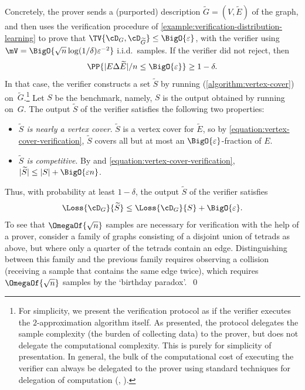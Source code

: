\begin{example}
	Concretely, the prover sends a (purported) description $\widetilde{G} = (V, \widetilde{E})$ of the graph, and then uses the verification procedure of \cref{example:verification-distribution-learning} to prove that $\TV{\cD_G,\cD_{\widetilde{G}}} \leq \BigO{\varepsilon}$, with the verifier using $\mV = \BigO{\sqrt{n}\log(1/\delta)\varepsilon^{-2}}$ i.i.d.\ samples.
	If the verifier did not reject, then 
	\begin{equation}
		\label{equation:vertex-cover-verification}
		\PP{|E \Delta \widetilde{E}|/n \leq \BigO{\varepsilon}} \geq 1-\delta.
	\end{equation}
	In that case, the verifier constructs a set $\widetilde{S}$ by running  (\cref{algorithm:vertex-cover}) on~$\widetilde{G}$.\footnote{%
	  For simplicity, we present the verification protocol as if the verifier executes the $2$-approximation algorithm itself. As presented, the protocol delegates the sample complexity (the burden of collecting data) to the prover, but does not delegate the computational complexity. This is purely for simplicity of presentation. In general, the bulk of the computational %
cost  %
of executing the verifier can always be delegated to the prover using standard techniques for delegation of computation (\eg, \cite{DBLP:journals/jacm/GoldwasserKR15}).%
	}
	Let $S$ be the benchmark, namely, $S$ is the output obtained by running  on~$G$.
	The output $\widetilde{S}$ of the verifier satisfies the following two properties:
	\begin{itemize}
		\item{
			\emph{$\widetilde{S}$ is nearly a vertex cover}. $\widetilde{S}$ is a vertex cover for $\widetilde{E}$, so by \cref{equation:vertex-cover-verification}, $\widetilde{S}$ covers all but at most an $\BigO{\varepsilon}$-fraction of $E$.
		}
		\item{
			\emph{$\widetilde{S}$ is competitive}. By  and \cref{equation:vertex-cover-verification}, $|\widetilde{S}| \leq |S| + \BigO{\varepsilon n}$.
		}
	\end{itemize}
	Thus, with probability at least $1-\delta$, the output $\widetilde{S}$ of the verifier satisfies
	\[
		\Loss{\cD_G}{\widetilde{S}} \leq \Loss{\cD_G}{S} + \BigO{\varepsilon}.
	\]
	To see that $\OmegaOf{\sqrt{n}}$ samples are necessary for verification with the help of a prover, consider a family of graphs consisting of a disjoint union of tetrads as above, but where only a quarter of the tetrads contain an edge. Distinguishing between this family and the previous family requires observing a collision (receiving a sample that contains the same edge twice), which requires $\OmegaOf{\sqrt{n}}$ samples by the `birthday paradox'.~\qed
\end{example}


